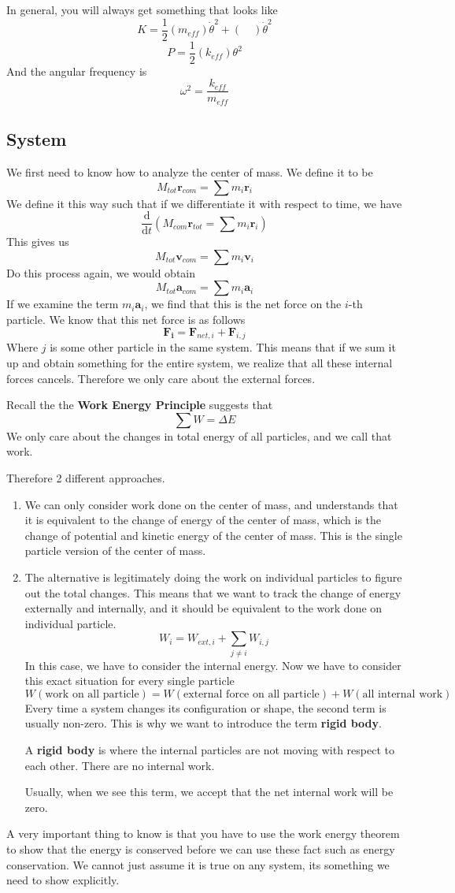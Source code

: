 \documentclass[12pt]{article}
\newcommand{\dydx}[2]{\frac{\text{d} #1}{\text{d} #2}}
\newcommand{\paren}[1]{\left( #1 \right)}
\begin{document}
In general, you will always get something that looks like
\[
K = \frac{1}{2}\paren{m_{eff}}\dot{\theta}^2 + \paren{\quad} \dot{\theta}^2
\]
\[
P = \frac{1}{2}\paren{k_{eff}}\theta^2
\]
And the angular frequency is
\[
\omega^2 = \frac{k_{eff}}{m_{eff}}
\]
\subsection{System}
We first need to know how to analyze the center of mass. We define it to be 
\[
M_{tot}\mathbf{r}_{com} = \sum m_i\mathbf{r}_i
\]
We define it this way such that if we differentiate it with respect to time, we have
\[
\dydx{}{t}\paren{M_{com}\mathbf{r}_{tot} = \sum m_i\mathbf{r}_i}
\]
This gives us
\[
M_{tot}\mathbf{v}_{com} = \sum m_i \mathbf{v}_i
\]
Do this process again, we would obtain
\[
M_{tot}\mathbf{a}_{com} = \sum m_i \mathbf{a}_i
\]
If we examine the term $m_i\mathbf{a}_i$, we find that this is the net force on the $i$-th particle. We know that this net force is as follows
\[
\mathbf{F_i} = \mathbf{F}_{net,i} + \mathbf{F}_{i,j}
\]
Where $j$ is some other particle in the same system. This means that if we sum it up and obtain something for the entire system, we realize that all these internal forces cancels. Therefore we only care about the external forces. 

Recall the the \textbf{Work Energy Principle} suggests that
\[
\sum W = \Delta E
\]
We only care about the changes in total energy of all particles, and we call that work. 

Therefore 2 different approaches. 
\begin{enumerate}
    \item We can only consider work done on the center of mass, and understands that it is equivalent to the change of energy of the center of mass, which is the change of potential and kinetic energy of the center of mass. This is the single particle version of the center of mass.
    \item The alternative is legitimately doing the work on individual particles to figure out the total changes. This means that we want to track the change of energy externally and internally, and it should be equivalent to the work done on individual particle. 
    \[
    W_{i} = W_{ext,i} + \sum_{j\neq i} W_{i,j}
    \]
    In this case, we have to consider the internal energy. Now we have to consider this exact situation for every single particle
    \[
    W(\text{work on all particle}) = W(\text{external force on all particle}) + W(\text{all internal work})
    \]
    Every time a system changes its configuration or shape, the second term is usually non-zero. This is why we want to introduce the term \textbf{rigid body}. 

    A \textbf{rigid body} is where the internal particles are not moving with respect to each other. There are no internal work.

    Usually, when we see this term, we accept that the net internal work will be zero. 
\end{enumerate}

A very important thing to know is that you have to use the work energy theorem to show that the energy is conserved before we can use these fact such as energy conservation. We cannot just assume it is true on any system, its something we need to show explicitly. 
\end{document}
